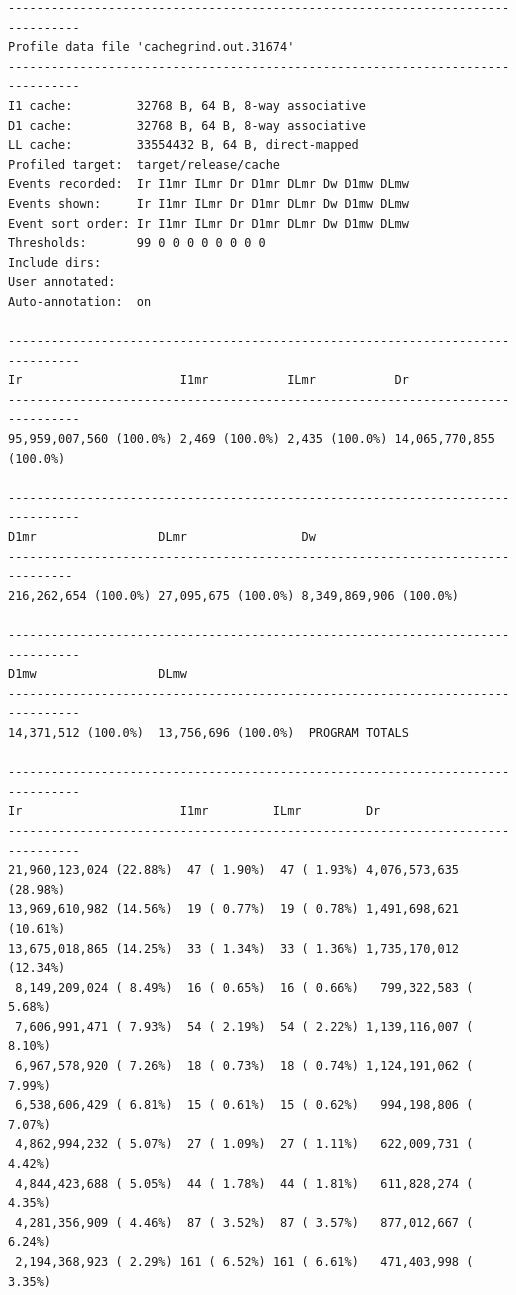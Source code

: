 \documentclass[a4paper,oneside,12pt]{book}
\begin{document}
\begin{verbatim}
--------------------------------------------------------------------------------
Profile data file 'cachegrind.out.31674'
--------------------------------------------------------------------------------
I1 cache:         32768 B, 64 B, 8-way associative
D1 cache:         32768 B, 64 B, 8-way associative
LL cache:         33554432 B, 64 B, direct-mapped
Profiled target:  target/release/cache
Events recorded:  Ir I1mr ILmr Dr D1mr DLmr Dw D1mw DLmw
Events shown:     Ir I1mr ILmr Dr D1mr DLmr Dw D1mw DLmw
Event sort order: Ir I1mr ILmr Dr D1mr DLmr Dw D1mw DLmw
Thresholds:       99 0 0 0 0 0 0 0 0
Include dirs:     
User annotated:   
Auto-annotation:  on

--------------------------------------------------------------------------------
Ir                      I1mr           ILmr           Dr                      
--------------------------------------------------------------------------------
95,959,007,560 (100.0%) 2,469 (100.0%) 2,435 (100.0%) 14,065,770,855 (100.0%) 

--------------------------------------------------------------------------------
D1mr                 DLmr                Dw                                     
-------------------------------------------------------------------------------              
216,262,654 (100.0%) 27,095,675 (100.0%) 8,349,869,906 (100.0%)  

--------------------------------------------------------------------------------
D1mw                 DLmw
--------------------------------------------------------------------------------
14,371,512 (100.0%)  13,756,696 (100.0%)  PROGRAM TOTALS

--------------------------------------------------------------------------------
Ir                      I1mr         ILmr         Dr                     
--------------------------------------------------------------------------------
21,960,123,024 (22.88%)  47 ( 1.90%)  47 ( 1.93%) 4,076,573,635 (28.98%) 
13,969,610,982 (14.56%)  19 ( 0.77%)  19 ( 0.78%) 1,491,698,621 (10.61%) 
13,675,018,865 (14.25%)  33 ( 1.34%)  33 ( 1.36%) 1,735,170,012 (12.34%) 
 8,149,209,024 ( 8.49%)  16 ( 0.65%)  16 ( 0.66%)   799,322,583 ( 5.68%) 
 7,606,991,471 ( 7.93%)  54 ( 2.19%)  54 ( 2.22%) 1,139,116,007 ( 8.10%) 
 6,967,578,920 ( 7.26%)  18 ( 0.73%)  18 ( 0.74%) 1,124,191,062 ( 7.99%) 
 6,538,606,429 ( 6.81%)  15 ( 0.61%)  15 ( 0.62%)   994,198,806 ( 7.07%) 
 4,862,994,232 ( 5.07%)  27 ( 1.09%)  27 ( 1.11%)   622,009,731 ( 4.42%) 
 4,844,423,688 ( 5.05%)  44 ( 1.78%)  44 ( 1.81%)   611,828,274 ( 4.35%) 
 4,281,356,909 ( 4.46%)  87 ( 3.52%)  87 ( 3.57%)   877,012,667 ( 6.24%) 
 2,194,368,923 ( 2.29%) 161 ( 6.52%) 161 ( 6.61%)   471,403,998 ( 3.35%) 



\end{verbatim}
\end{document}
